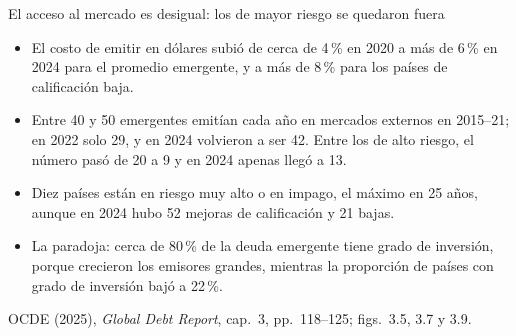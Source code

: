\documentclass[aspectratio=169,11pt]{beamer}
\newcommand{\fuente}[1]{\par\vfill{\small\color{cGris}#1\par}}
\newcommand{\GDR}{OCDE (2025), \emph{Global Debt Report}}
\begin{document}
\begin{frame}{El acceso al mercado es desigual: los de mayor riesgo se quedaron fuera}
  \small
  \begin{itemize}
    \item<1-> El costo de emitir en dólares subió de cerca de 4\,\% en 2020 a más de 6\,\% en 2024 para el promedio emergente, y a más de 8\,\% para los países de calificación baja.
    \item<2-> Entre 40 y 50 emergentes emitían cada año en mercados externos en 2015--21; en 2022 solo 29, y en 2024 volvieron a ser 42. Entre los de alto riesgo, el número pasó de 20 a 9 y en 2024 apenas llegó a 13.
    \item<3-> Diez países están en riesgo muy alto o en impago, el máximo en 25 años, aunque en 2024 hubo 52 mejoras de calificación y 21 bajas.
    \item<4-> La paradoja: cerca de 80\,\% de la deuda emergente tiene grado de inversión, porque crecieron los emisores grandes, mientras la proporción de países con grado de inversión bajó a 22\,\%.
  \end{itemize}
  \fuente{\GDR, cap.~3, pp.~118--125; figs.~3.5, 3.7 y 3.9.}
\end{frame}
\end{document}

